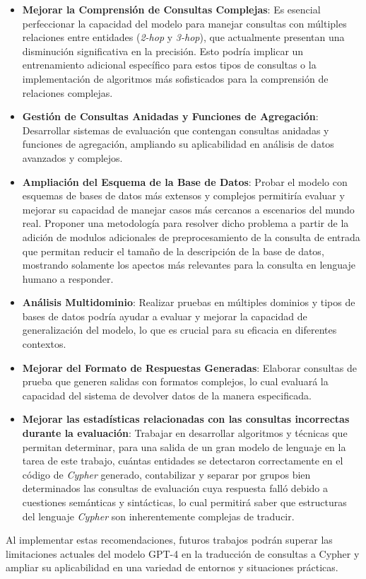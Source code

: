 \begin{itemize}
   \item \textbf{Mejorar la Comprensión de Consultas Complejas}: Es esencial perfeccionar la capacidad del modelo para manejar consultas con múltiples relaciones entre entidades (\textit{2-hop} y \textit{3-hop}), que actualmente presentan una disminución significativa en la precisión. Esto podría implicar un entrenamiento adicional específico para estos tipos de consultas o la implementación de algoritmos más sofisticados para la comprensión de relaciones complejas.

  \item \textbf{Gestión de Consultas Anidadas y Funciones de Agregación}: Desarrollar sistemas de evaluación que contengan consultas anidadas y funciones de agregación, ampliando su aplicabilidad en análisis de datos avanzados y complejos.

   \item \textbf{Ampliación del Esquema de la Base de Datos}: Probar el modelo con esquemas de bases de datos más extensos y complejos permitiría evaluar y mejorar su capacidad de manejar casos más cercanos a escenarios del mundo real. Proponer una metodología para resolver dicho problema a partir de la adición de modulos adicionales de preprocesamiento de la consulta de entrada que permitan reducir el tamaño de la descripción de la base de datos, mostrando solamente los apectos más relevantes para la consulta en lenguaje humano a responder.

   \item \textbf{Análisis Multidominio}: Realizar pruebas en múltiples dominios y tipos de bases de datos podría ayudar a evaluar y mejorar la capacidad de generalización del modelo, lo que es crucial para su eficacia en diferentes contextos.

     \item \textbf{Mejorar del Formato de Respuestas Generadas}: Elaborar consultas de prueba que generen salidas con formatos complejos, lo cual evaluará la capacidad del sistema de devolver datos de la manera especificada.

    \item \textbf{Mejorar las estadísticas relacionadas con las consultas incorrectas durante la evaluación}: Trabajar en desarrollar algoritmos y técnicas que permitan determinar, para una salida de un gran modelo de lenguaje en la tarea de este trabajo, cuántas entidades se detectaron correctamente en el código de \textit{Cypher} generado, contabilizar y separar por grupos bien determinados las consultas de evaluación cuya respuesta falló debido a cuestiones semánticas y sintácticas, lo cual permitirá saber que estructuras del lenguaje \textit{Cypher} son inherentemente complejas de traducir.

\end{itemize}

Al implementar estas recomendaciones, futuros trabajos podrán superar las limitaciones actuales del modelo GPT-4 en la traducción de consultas a Cypher y ampliar su aplicabilidad en una variedad de entornos y situaciones prácticas.